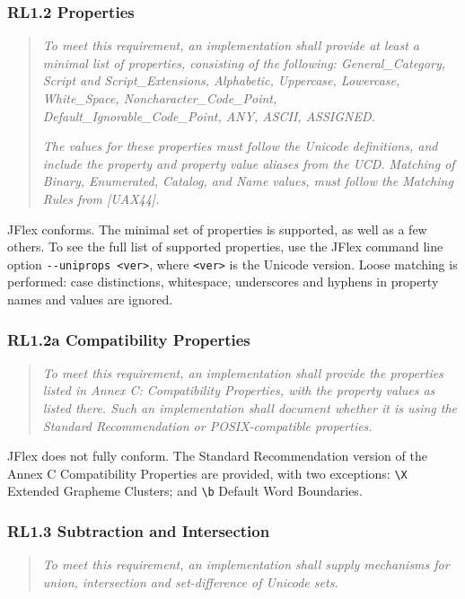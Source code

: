 \documentclass[11pt]{scrartcl}
\begin{document}
\subsubsection*{RL1.2 Properties}

\begin{quote}
\emph{To meet this requirement, an implementation shall provide at least a
minimal list of properties, consisting of the following: General\_Category,
Script and Script\_Exten\-sions, Alphabetic, Uppercase, Lowercase, White\_Space,
Noncharacter\_Code\_Point, Default\_Ignorable\_Code\_Point, ANY, ASCII, ASSIGNED.}

\emph{The values for these properties must follow the Unicode definitions, 
and include the property and property value aliases from the UCD. Matching
of Binary, Enumerated, Catalog, and Name values, must follow the
Matching Rules from [UAX44].}
\end{quote}

JFlex conforms.  The minimal set of properties is supported, as well as
a few others. To see the full list of supported properties, use the JFlex
command line option \verb+--uniprops <ver>+, where \verb+<ver>+ is the
Unicode version.  Loose matching is performed: case distinctions, 
whitespace, underscores and hyphens in property names and values are
ignored.

\subsubsection*{RL1.2a Compatibility Properties}

\begin{quote}
\emph{To meet this requirement, an implementation shall provide the properties
listed in Annex C: Compatibility Properties, with the property values as
listed there. Such an implementation shall document whether it is using
the Standard Recommendation or POSIX-compatible properties.}
\end{quote}

JFlex does not fully conform. The Standard Recommendation version of the
Annex C Compatibility Properties are provided, with two exceptions:
\verb+\X+ Extended Grapheme Clusters; and \verb+\b+ Default Word
Boundaries.

\subsubsection*{RL1.3 Subtraction and Intersection}

\begin{quote}
\emph{To meet this requirement, an implementation shall supply mechanisms for
union, intersection and set-difference of Unicode sets.}
\end{quote}
\end{document}
